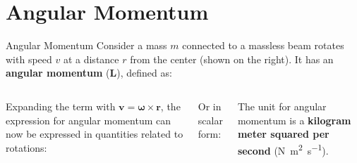 \documentclass[12pt,compress,aspectratio=169]{beamer}
\begin{document}
\section{Angular Momentum}

\begin{frame}{Angular Momentum}
  Consider a mass $m$ connected to a massless beam rotates with speed $v$ at
  a distance $r$ from the center (shown on the right). It has an
  \textbf{angular momentum} ($\bm{L}$), defined as:
  \begin{columns}
    
    \eq{-.32in}{
      \boxed{\bm{L}=\bm{r}\times\bm{p}=m(\bm{r}\times\bm{v})}%
    }

    \vspace{-.1in}Expanding the term with $\bm{v}=\bm\omega\times\bm{r}$, the
    expression for angular momentum can now be expressed in quantities related
    to rotations:

    
    \vspace{-.2in}Or in scalar form:
    

    \vspace{-.2in}The unit for angular momentum is a
    \textbf{kilogram meter squared per second}
    (\si{\newton\metre\squared\per\second}).
    
  \end{columns}
\end{frame}
\end{document}
